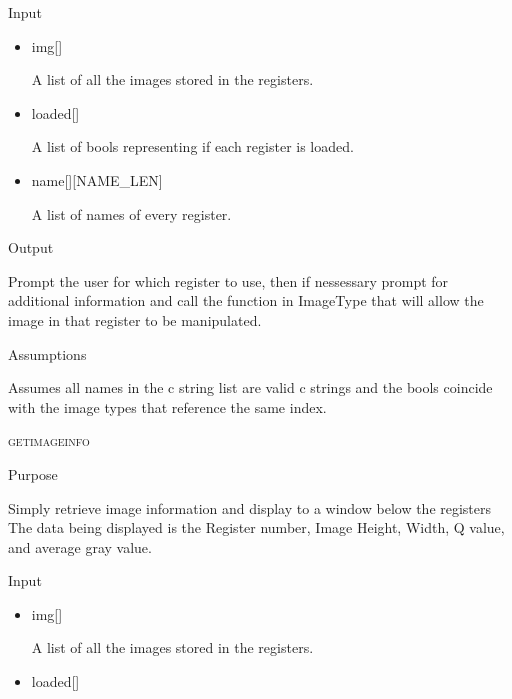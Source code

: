 \documentclass[pdftex, 11pt]{article}
\begin{document}
\begin{description}
\begin{description}
			\item{Input}

				\begin{itemize}

					\item{img[]}

						A list of all the images stored in the registers.

					\item{loaded[]}

						A list of bools representing if each register is loaded.

					\item{name[][NAME\_LEN]}

						A list of names of every register.

				\end{itemize}

			\item{Output}

				Prompt the user for which register to use, then if nessessary
				prompt for additional information and call the function
				in ImageType that will allow the image in that register to
				be manipulated.

			\item{Assumptions}

				Assumes all names in the c string list are valid c
				strings and the bools coincide with the image types that
				reference the same index.

		\end{description}



	\item{\textsc{getimageinfo}}
		\begin{description}
			\item{Purpose}

				Simply retrieve image information and display to a window below the registers
				The data being displayed is the Register number, Image Height, Width, Q value,
				and average gray value.

			\item{Input}

				\begin{itemize}

					\item{img[]}

						A list of all the images stored in the registers.

					\item{loaded[]}


\end{itemize}
\end{description}
\end{description}
\end{document}
